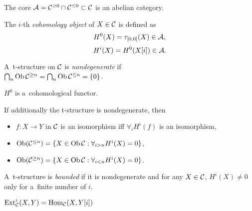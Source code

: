 



    
    \begin{theorem}
        The core $\mathcal{A} = \mathcal{C}^{\geq 0} \cap \mathcal{C}^{\leq 0} \subset \mathcal{C}$ 
        is an abelian category.
    \end{theorem}
    
    \begin{definition}
        The $i$-th {\em cohomology object} of $X \in \mathcal{C}$
        is defined as
        $$H^0(X) = \tau_{[0,0]}(X) \in \mathcal{A},$$
        $$H^i(X) = H^0(X[i]) \in \mathcal{A}.$$
    \end{definition}
    
    \begin{definition}
        A~t-structure on $\mathcal{C}$ is {\em nondegenerate} if \\
        ${\bigcap_n \operatorname{Ob} \mathcal{C}^{\geq n}
        = \bigcap_n \operatorname{Ob} \mathcal{C}^{\leq n} = \{0\}}$.
    \end{definition}

    
    \begin{theorem}
        $H^0$ is a~cohomological functor.
        
        If additionally the t-structure is nondegenerate,
        then
        \begin{itemize}
            \item $f:X \to Y$ in $\mathcal{C}$ is an isomorphism 
            iff $\forall_i H^i(f)$ is an isomorphism,
            \item $\operatorname{Ob}(\mathcal{C}^{\leq n}) = 
            \{ X \in \operatorname{Ob} \mathcal{C}: \forall_{i>n} H^i(X) = 0 \}$,
            \item $\operatorname{Ob}(\mathcal{C}^{\geq n}) =
            \{ X \in \operatorname{Ob} \mathcal{C}: \forall_{i<n} H^i(X) = 0 \}$.
        \end{itemize}
    \end{theorem}
    
    \begin{definition}
        A~t-structure is {\em bounded} if it is nondegenerate
        and for any $X \in \mathcal{C}$,
        $H^i(X) \neq 0$ only for a~finite number of $i$.
    \end{definition}
    
    \begin{definition}[$\Ext$]
        $\operatorname{Ext}_{\mathcal{C}}^i(X,Y) = \operatorname{Hom}_{\mathcal{C}}(X,Y[i])$
    \end{definition}
    
